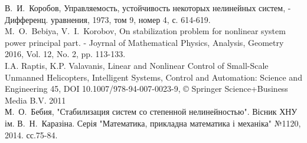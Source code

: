 \documentclass{article}
\begin{document}
\pagebreak
\begin{thebibliography}{}
    В.~И.~Коробов, Управляемость, устойчивость некоторых нелинейных систем, 
    -  Дифференц. уравнения, 1973, том 9, номер 4, с. 614-619.\\
    M.~O.~Bebiya, V.~I.~Korobov, On stabilization problem for nonlinear system power principal part. 
    - Joyrnal of Mathematical Physics, Analysis, Geometry 2016, Vol. 12, No. 2, pp. 113-133.\\
    I.A. Raptis, K.P. Valavanis, Linear and Nonlinear Control of Small-Scale Unmanned Helicopters, 
    Intelligent Systems, Control and Automation: Science and Engineering 45, 
    DOI 10.1007/978-94-007-0023-9, © Springer Science+Business Media B.V. 2011\\
    М.~О.~Бебия, "Стабилизация систем со степенной нелинейностью". Вісник ХНУ ім. В.~Н.~Каразіна. 
    Серія "Математика, прикладна математика і механіка" №1120, 2014. сс.75-84.\\
\end{thebibliography}
\end{document}
